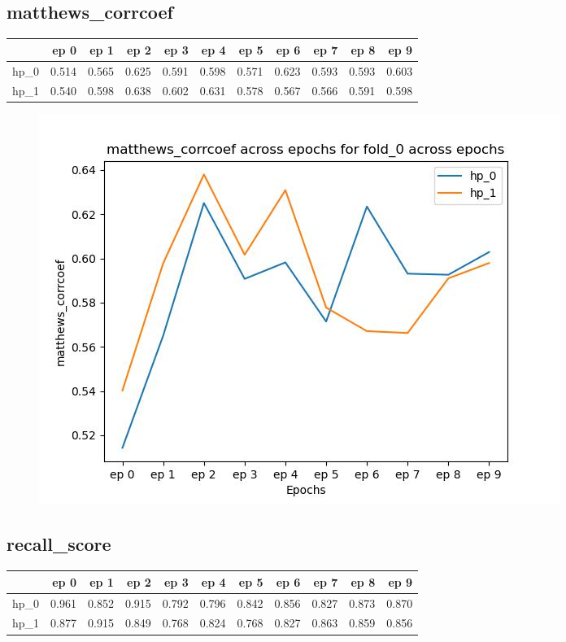 \documentclass{article}
\begin{document}
\subsection{matthews\_corrcoef}
\begin{tabular}{lrrrrrrrrrr}
\toprule
{} &   ep 0 &   ep 1 &   ep 2 &   ep 3 &   ep 4 &   ep 5 &   ep 6 &   ep 7 &   ep 8 &   ep 9 \\
\midrule
hp\_0 &  0.514 &  0.565 &  0.625 &  0.591 &  0.598 &  0.571 &  0.623 &  0.593 &  0.593 &  0.603 \\
hp\_1 &  0.540 &  0.598 &  0.638 &  0.602 &  0.631 &  0.578 &  0.567 &  0.566 &  0.591 &  0.598 \\
\bottomrule
\end{tabular}

\begin{figure}[H]
\includegraphics[scale = 0.75]{fold_0/matthews_corrcoef}
\end{figure}
\subsection{recall\_score}
\begin{tabular}{lrrrrrrrrrr}
\toprule
{} &   ep 0 &   ep 1 &   ep 2 &   ep 3 &   ep 4 &   ep 5 &   ep 6 &   ep 7 &   ep 8 &   ep 9 \\
\midrule
hp\_0 &  0.961 &  0.852 &  0.915 &  0.792 &  0.796 &  0.842 &  0.856 &  0.827 &  0.873 &  0.870 \\
hp\_1 &  0.877 &  0.915 &  0.849 &  0.768 &  0.824 &  0.768 &  0.827 &  0.863 &  0.859 &  0.856 \\
\bottomrule
\end{tabular}
\end{document}
